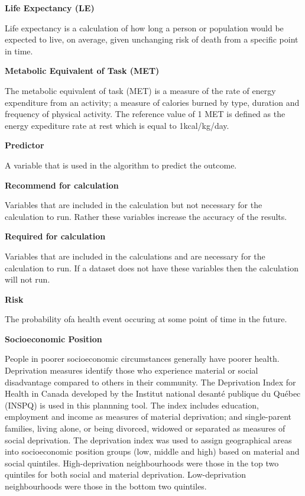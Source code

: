 \documentclass[]{book}
\begin{document}
\textbf{Life Expectancy (LE)}

Life expectancy is a calculation of how long a person or
population would be expected to live, on average, given unchanging risk
of death from a specific point in time.

\textbf{Metabolic Equivalent of Task (MET)}

The metabolic equivalent of task (MET) is a measure of the rate of
energy expenditure from an activity; a measure of calories burned by
type, duration and frequency of physical activity. The reference value
of 1 MET is defined as the energy expediture rate at rest which is equal
to 1kcal/kg/day.

\textbf{Predictor}

A variable that is used in the algorithm to predict the outcome.

\textbf{Recommend for calculation}

Variables that are included in the calculation but not necessary for the
calculation to run. Rather these variables increase the accuracy of the
results.

\textbf{Required for calculation}

Variables that are included in the calculations and are necessary for
the calculation to run. If a dataset does not have these variables then
the calculation will not run.

\textbf{Risk}

The probability ofa health event occuring at some point of time in the
future.

\textbf{Socioeconomic Position}

People in poorer socioeconomic circumstances generally have poorer
health. Deprivation measures identify those who experience material or
social disadvantage compared to others in their community. The
Deprivation Index for Health in Canada developed by the Institut
national desanté publique du Québec (INSPQ)\citep{INSPQ2000} is used in
this plannning tool. The index includes education, employment and income
as measures of material deprivation; and single-parent families, living
alone, or being divorced, widowed or separated as measures of social
deprivation. The deprivation index was used to assign geographical areas
into socioeconomic position groups (low, middle and high) based on
material and social quintiles. High-deprivation neighbourhoods were
those in the top two quintiles for both social and material deprivation.
Low-deprivation neighbourhoods were those in the bottom two quintiles.
\end{document}
